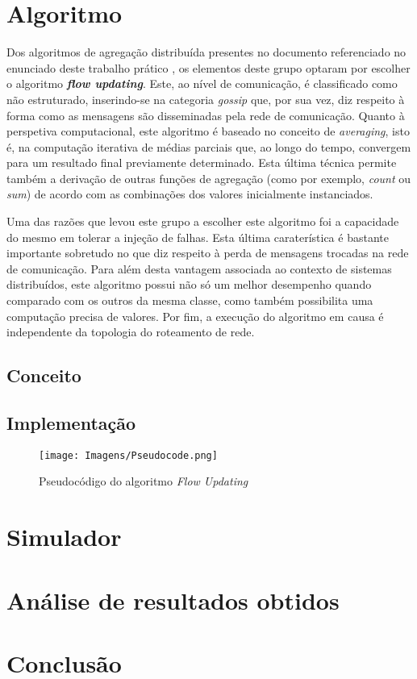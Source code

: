 \documentclass[a4paper]{article}
\begin{document}
\section{Algoritmo} \label{sec:Algorithm}
\large{
	Dos algoritmos de agregação distribuída presentes no documento referenciado no enunciado deste trabalho prático \parencite{article}, os elementos deste grupo optaram por escolher o algoritmo \textbf{\textit{flow updating}}.
	Este, ao nível de comunicação, é classificado como não estruturado, inserindo-se na categoria \textit{gossip} que, por sua vez, diz respeito à forma como as mensagens são disseminadas pela rede de comunicação.
	Quanto à perspetiva computacional, este algoritmo é baseado no conceito de \textit{averaging}, isto é, na computação iterativa de médias parciais que, ao longo do tempo, convergem para um resultado final previamente determinado.
	Esta última técnica permite também a derivação de outras funções de agregação (como por exemplo, \textit{count} ou \textit{sum}) de acordo com as combinações dos valores inicialmente instanciados.

	Uma das razões que levou este grupo a escolher este algoritmo foi a capacidade do mesmo em tolerar a injeção de falhas. Esta última caraterística é bastante importante sobretudo no que diz respeito à perda de mensagens trocadas na rede de comunicação.
	Para além desta vantagem associada ao contexto de sistemas distribuídos, este algoritmo possui não só um melhor desempenho quando comparado com os outros da mesma classe, como também possibilita uma computação precisa de valores.
	Por fim, a execução do algoritmo em causa é independente da topologia do roteamento de rede.

	\subsection{Conceito} \label{subsec:Concept}

	\subsection{Implementação} \label{subsec:Implementation}

	\begin{figure}[H]
		\centering
		\texttt{[image: Imagens/Pseudocode.png]}
		\caption{Pseudocódigo do algoritmo \textit{Flow Updating}}
		\label{fig:1}
	\end{figure}
}

\section{Simulador} \label{sec:Simulator}

\section{Análise de resultados obtidos} \label{sec:Analysis of results}

\section{Conclusão} \label{sec:Conclusion}
\large{
	
}

\printbibliography[heading=bibintoc]
\end{document}
